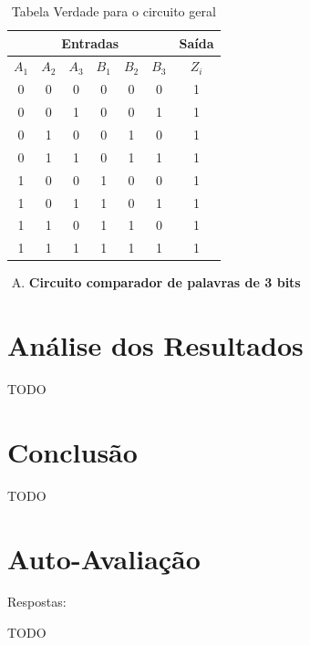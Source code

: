 \documentclass[12pt]{article}
\begin{document}
\begin{table}[H]
    \centering
    \caption{Tabela Verdade para o circuito geral}
    \begin{tabular}{|c|c|c|c|c|c|c|}\hline
    \multicolumn{6}{|c|}{Entradas} & \multicolumn{1}{|c|}{Saída} \\\hline
    $A_{1}$ & $A_{2}$ & $A_{3}$ & $B_{1}$ & $B_{2}$ & $B_{3}$ & $Z_{i}$ \\\hline
    0 & 0 & 0 & 0 & 0 & 0 & 1 \\\hline
    0 & 0 & 1 & 0 & 0 & 1 & 1 \\\hline
    0 & 1 & 0 & 0 & 1 & 0 & 1 \\\hline
    0 & 1 & 1 & 0 & 1 & 1 & 1 \\\hline
    1 & 0 & 0 & 1 & 0 & 0 & 1 \\\hline
    1 & 0 & 1 & 1 & 0 & 1 & 1 \\\hline
    1 & 1 & 0 & 1 & 1 & 0 & 1 \\\hline
    1 & 1 & 1 & 1 & 1 & 1 & 1 \\\hline
    \end{tabular}\label{tab:comparador_de_palavras_3_bits}
\end{table}


\begin{enumerate}[E)]
\item \textbf{Circuito comparador de palavras de 3 bits}
\end{enumerate}

\section{Análise dos Resultados}
\label{sec:Resultados}

TODO

\section{Conclusão}
\label{sec:Conclusao}

TODO

\nocite{*}



\newpage
\section*{Auto-Avaliação}

Respostas:

TODO
\end{document}
